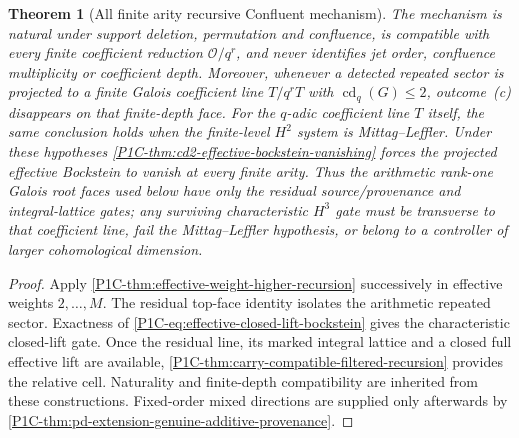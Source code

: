 \documentclass[11pt]{article}
\newtheorem{theorem}{Theorem}[section]
\theoremstyle{remark}
\begin{document}
\begin{theorem}[All finite arity recursive Confluent mechanism]
The mechanism is natural under support deletion, permutation and confluence, is compatible with every
finite coefficient reduction $\mathcal O/q^r$, and never identifies jet order, confluence multiplicity or
coefficient depth.  Moreover, whenever a detected repeated sector is projected to a finite Galois coefficient line
$T/q^rT$ with $\operatorname{cd}_q(G)\le2$, outcome~(c) disappears on that finite-depth face.  For the
$q$-adic coefficient line $T$ itself, the same conclusion holds when the finite-level $H^2$ system is
Mittag--Leffler.  Under these hypotheses \cref{P1C-thm:cd2-effective-bockstein-vanishing} forces the projected
effective Bockstein to vanish at every finite arity.  Thus the arithmetic rank-one Galois root faces used
below have only the residual source/provenance and integral-lattice gates; any surviving characteristic
$H^3$ gate must be transverse to that coefficient line, fail the Mittag--Leffler hypothesis, or belong to a
controller of larger cohomological dimension.
\end{theorem}

\begin{proof}
Apply \cref{P1C-thm:effective-weight-higher-recursion} successively in effective weights
$2,\ldots,M$.  The residual top-face identity isolates the arithmetic repeated sector.  Exactness of
\eqref{P1C-eq:effective-closed-lift-bockstein} gives the characteristic closed-lift gate.  Once the residual
line, its marked integral lattice and a closed full effective lift are available,
\cref{P1C-thm:carry-compatible-filtered-recursion} provides the relative cell.  Naturality and finite-depth
compatibility are inherited from these constructions.  Fixed-order mixed directions are supplied only
afterwards by \cref{P1C-thm:pd-extension-genuine-additive-provenance}.
\end{proof}
\end{document}
